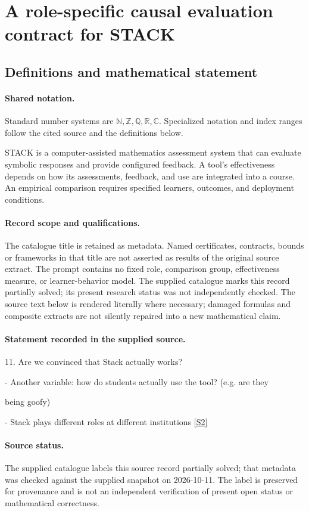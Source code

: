 \documentclass[11pt]{article}
\newcommand{\sref}[2]{\hyperlink{source:#1:#2}{[S#2]}}
\begin{document}
\section{A role-specific causal evaluation contract for STACK}\label{statement}

\subsection{Definitions and mathematical statement}

\paragraph{Shared notation.}Standard number systems are $\mathbb N,\mathbb Z,\mathbb Q,\mathbb R,\mathbb C$. Specialized notation and index ranges follow the cited source and the definitions below.


STACK is a computer-assisted mathematics assessment system that can evaluate symbolic responses and provide configured feedback. A tool's effectiveness depends on how its assessments, feedback, and use are integrated into a course. An empirical comparison requires specified learners, outcomes, and deployment conditions.
\paragraph{Record scope and qualifications.}
The catalogue title is retained as metadata. Named certificates, contracts, bounds or frameworks in that title are not asserted as results of the original source extract.
The prompt contains no fixed role, comparison group, effectiveness measure, or learner-behavior model. The supplied catalogue marks this record partially solved; its present research status was not independently checked.
The source text below is rendered literally where necessary; damaged formulas and composite extracts are not silently repaired into a new mathematical claim.
\paragraph{Statement recorded in the supplied source.}
11. Are we convinced that Stack actually works?

- Another variable: how do students actually use the tool? (e.g. are they

being goofy)

- Stack plays different roles at different institutions \sref{statement}{2}
\paragraph{Source status.}
The supplied catalogue labels this source record partially solved; that metadata was checked against the supplied snapshot on 2026-10-11. The label is preserved for provenance and is not an independent verification of present open status or mathematical correctness.
\end{document}

